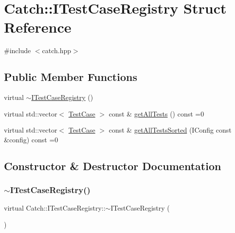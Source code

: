 \hypertarget{struct_catch_1_1_i_test_case_registry}{}\section{Catch\+:\+:I\+Test\+Case\+Registry Struct Reference}
\label{struct_catch_1_1_i_test_case_registry}


{\ttfamily \#include $<$catch.\+hpp$>$}

\subsection*{Public Member Functions}
\begin{DoxyCompactItemize}
\item 
virtual \mbox{\hyperlink{struct_catch_1_1_i_test_case_registry_ae14798f05ac8e2b18cff532849a4da81}{$\sim$\+I\+Test\+Case\+Registry}} ()
\item 
virtual std\+::vector$<$ \mbox{\hyperlink{class_catch_1_1_test_case}{Test\+Case}} $>$ const  \& \mbox{\hyperlink{struct_catch_1_1_i_test_case_registry_ad6e4d4a621655123f73ae98cfeda063d}{get\+All\+Tests}} () const =0
\item 
virtual std\+::vector$<$ \mbox{\hyperlink{class_catch_1_1_test_case}{Test\+Case}} $>$ const  \& \mbox{\hyperlink{struct_catch_1_1_i_test_case_registry_a33e46639d0319d35497c05bb5d02be5a}{get\+All\+Tests\+Sorted}} (I\+Config const \&config) const =0
\end{DoxyCompactItemize}


\subsection{Constructor \& Destructor Documentation}
\mbox{\label{struct_catch_1_1_i_test_case_registry_ae14798f05ac8e2b18cff532849a4da81}} 
\subsubsection{\texorpdfstring{$\sim$\+I\+Test\+Case\+Registry()}{~ITestCaseRegistry()}}
{\footnotesize\ttfamily virtual Catch\+::\+I\+Test\+Case\+Registry\+::$\sim$\+I\+Test\+Case\+Registry (\begin{DoxyParamCaption}{ }\end{DoxyParamCaption})\hspace{0.3cm}{\ttfamily [virtual]}}



